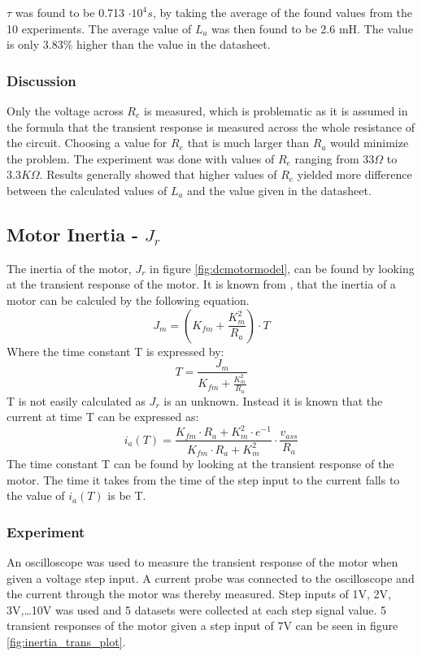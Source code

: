 $\tau$ was found to be 0.713 $\cdot 10^4 s$, by taking the average of the found values from the 10 experiments.
The average value of $L_a$ was then found to be 2.6 mH. The value is only $3.83\%$ higher than the value in the datasheet.

\subsubsection{Discussion}
Only the voltage across $R_e$ is measured, which is problematic as it is assumed in the formula that the transient response is measured across the whole resistance of the circuit. Choosing a value for $R_e$ that is much larger than $R_a$ would minimize the problem.
The experiment was done with values of $R_e$ ranging from $33\Omega$ to $3.3K\Omega$.
Results generally showed that higher values of $R_e$ yielded more difference between the calculated values of $L_a$ and the value given in the datasheet.

\subsection{Motor Inertia - $J_r$}
The inertia of the motor, $J_r$ in figure \ref{fig:dcmotormodel}, can be found by looking at the transient response of the motor. 
It is known from \cite{feedback}, that the inertia of a motor can be calculed by the following equation.
$$J_m = (K_{fm}+\frac{K_m^2}{R_a}) \cdot T$$
Where the time constant T is expressed by:
$$ T = \frac{J_m}{K_{fm}+\frac{K_m^2}{R_a}}$$
T is not easily calculated as $J_r$ is an unknown. Instead it is known that the current at time T can be expressed as:
$$ i_a(T) = \frac{K_{fm} \cdot R_a + K_m^2 \cdot e^{-1}}{K_{fm} \cdot R_a + K_m^2} \cdot \frac{v_{ass}}{R_a} $$
The time constant T can be found by looking at the transient response of the motor. 
The time it takes from the time of the step input to the current falls to the value of $i_a(T)$ is be T.

\subsubsection{Experiment}
An oscilloscope was used to measure the transient response of the motor when given a voltage step input. A current probe was connected to the oscilloscope and the current through the motor was thereby measured.
Step inputs of 1V, 2V, 3V,\dots 10V was used and 5 datasets were collected at each step signal value.  
5 transient responses of the motor given a step input of 7V can be seen in figure \ref{fig:inertia_trans_plot}.

